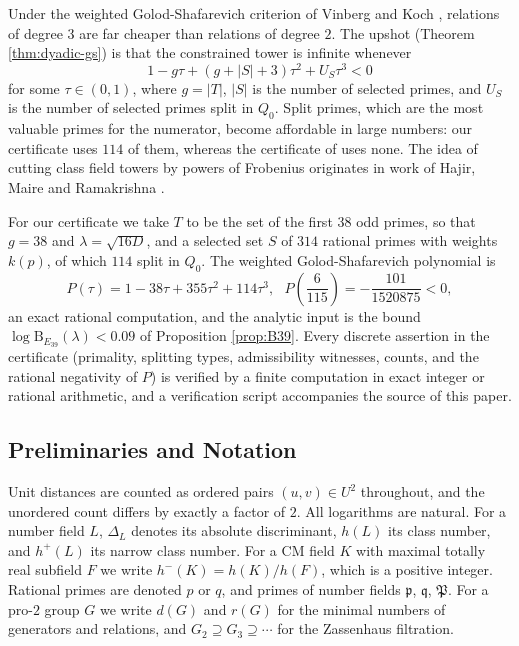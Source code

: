 Under the weighted Golod-Shafarevich criterion of Vinberg and Koch
\cite{Vinberg,Koch}, relations of degree $3$ are far cheaper than
relations of degree $2$. The upshot (Theorem \ref{thm:dyadic-gs}) is
that the constrained tower is infinite whenever
\[
1-g\tau+(g+|S|+3)\tau^{2}+U_{S}\tau^{3}<0
\]
for some $\tau\in(0,1)$, where $g=|T|$, $|S|$ is the number of selected
primes, and $U_{S}$ is the number of selected primes split in $Q_{0}$.
Split primes, which are the most valuable primes for the numerator,
become affordable in large numbers: our certificate uses $114$ of them,
whereas the certificate of \cite{Sawin} uses none. The idea of cutting
class field towers by powers of Frobenius originates in work of Hajir,
Maire and Ramakrishna \cite{HajirMaireRamakrishna}.

For our certificate we take $T$ to be the set of the first $38$ odd
primes, so that $g=38$ and $\lambda=\sqrt{16D}$, and a selected set $S$
of $314$ rational primes with weights $k(p)$, of which $114$ split in
$Q_{0}$. The weighted Golod-Shafarevich polynomial is
\[
P(\tau)=1-38\tau+355\tau^{2}+114\tau^{3},\ \ \ P\left(\frac{6}{115}\right)=-\frac{101}{1520875}<0,
\]
an exact rational computation, and the analytic input is the bound
$\log\mathrm{B}_{E_{39}}(\lambda)<0.09$ of Proposition \ref{prop:B39}.
Every discrete assertion in the certificate (primality, splitting
types, admissibility witnesses, counts, and the rational negativity of
$P$) is verified by a finite computation in exact integer or rational
arithmetic, and a verification script accompanies the source of this
paper.

\subsection{Preliminaries and Notation}

Unit distances are counted as ordered pairs $(u,v)\in U^{2}$ throughout,
and the unordered count differs by exactly a factor of $2$. All
logarithms are natural. For a number field $L$, $\Delta_{L}$ denotes its
absolute discriminant, $h(L)$ its class number, and $h^{+}(L)$ its
narrow class number. For a CM field $K$ with maximal totally real
subfield $F$ we write $h^{-}(K)=h(K)/h(F)$, which is a positive integer.
Rational primes are denoted $p$ or $q$, and primes of number fields
$\mathfrak{p}$, $\mathfrak{q}$, $\mathfrak{P}$. For a pro-$2$ group $G$
we write $d(G)$ and $r(G)$ for the minimal numbers of generators and
relations, and $G_{2}\supseteq G_{3}\supseteq\cdots$ for the Zassenhaus
filtration.

